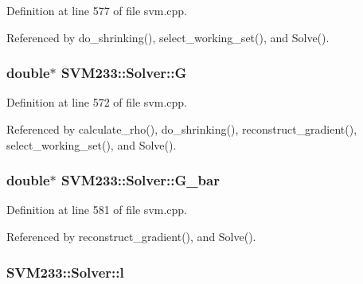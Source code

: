 Definition at line 577 of file svm.\+cpp.



Referenced by do\+\_\+shrinking(), select\+\_\+working\+\_\+set(), and Solve().

\subsubsection[{\texorpdfstring{G}{G}}]{\setlength{\rightskip}{0pt plus 5cm}double$\ast$ S\+V\+M233\+::\+Solver\+::G\hspace{0.3cm}{\ttfamily [protected]}}\hypertarget{class_s_v_m233_1_1_solver_a429fc1d5724c8e7547e02b74cac19f40}{}\label{class_s_v_m233_1_1_solver_a429fc1d5724c8e7547e02b74cac19f40}


Definition at line 572 of file svm.\+cpp.



Referenced by calculate\+\_\+rho(), do\+\_\+shrinking(), reconstruct\+\_\+gradient(), select\+\_\+working\+\_\+set(), and Solve().

\subsubsection[{\texorpdfstring{G\+\_\+bar}{G_bar}}]{\setlength{\rightskip}{0pt plus 5cm}double$\ast$ S\+V\+M233\+::\+Solver\+::\+G\+\_\+bar\hspace{0.3cm}{\ttfamily [protected]}}\hypertarget{class_s_v_m233_1_1_solver_a10333392b693eae19adc14427c277036}{}\label{class_s_v_m233_1_1_solver_a10333392b693eae19adc14427c277036}


Definition at line 581 of file svm.\+cpp.



Referenced by reconstruct\+\_\+gradient(), and Solve().

\subsubsection[{\texorpdfstring{l}{l}}]{ S\+V\+M233\+::\+Solver\+::l\hspace{0.3cm}{\ttfamily [protected]}}\hypertarget{class_s_v_m233_1_1_solver_a258ab441755a415c6b1f0b19f55f36fc}{}\label{class_s_v_m233_1_1_solver_a258ab441755a415c6b1f0b19f55f36fc}


